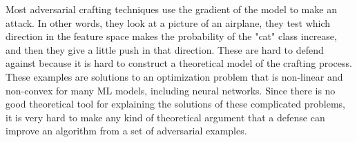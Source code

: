 Most adversarial crafting techniques use the gradient of the model to make an attack. In other words, they look at a picture of an airplane, they test which direction in the feature space makes the probability of the "cat" class increase, and then they give a little push in that direction. These are hard to defend against because it is hard to construct a theoretical model of the crafting process. These examples are solutions to an optimization problem that is non-linear and non-convex for many ML models, including neural networks. Since there is no good theoretical tool for explaining the solutions of these complicated problems, it is very hard to make any kind of theoretical argument that a defense can improve an algorithm from a set of adversarial examples.